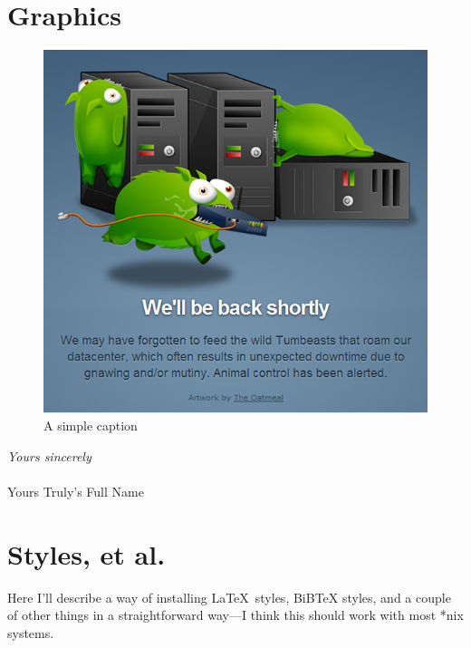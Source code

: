 \section{Graphics}
  \begin{figure}[ht!]
    \centering
    \includegraphics[scale=0.42]{tumbeasts.png}
    \caption{A simple caption}
    \label{overflow}
  \end{figure}

\begin{minipage}[c]{\textwidth}
  \vspace{1cm}
  \flushright\parbox{7.5cm}{\emph{Yours sincerely}\\
  \\[1.0cm]
  Yours Truly's Full Name}
  \flushright\parbox{7.5cm}{}
  \vspace{1cm}
\end{minipage}

\section{Styles, et al.}
  Here I'll describe a way of installing \LaTeX\ styles, BiBTeX styles, and a couple 
  of other things in a straightforward way---I think this should work with most 
  *nix systems.

